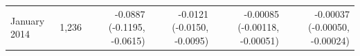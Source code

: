 \begin{tabular}{lrrrrr}
January 2014 & 1,236 & -0.0887 (-0.1195, -0.0615) & -0.0121 (-0.0150, -0.0095) & -0.00085 (-0.00118, -0.00051) & -0.00037 (-0.00050, -0.00024) \\

\end{tabular}
